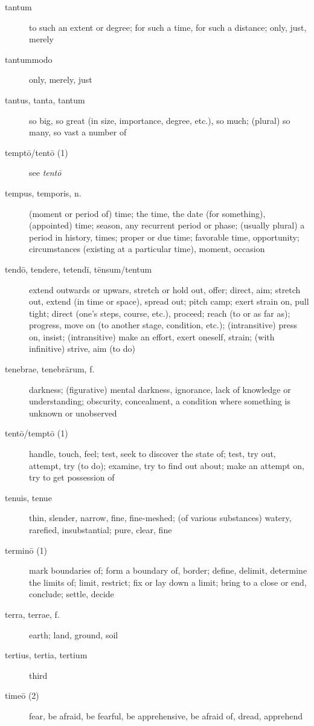 \begin{description}
    \item[tantum] \marginnote{*}to such an extent or degree; for such a time, for such a distance; only, just, merely
    \item[tantummodo] \marginnote{*}only, merely, just
    \item[tantus, tanta, tantum] \marginnote{*}so big, so great (in size, importance, degree, etc.), so much; (plural) so many, so vast a number of
    \item[temptō/tentō (1)] see \textit{tentō}
    \item[tempus, temporis, n.] \marginnote{*}(moment or period of) time; the time, the date (for something), (appointed) time; season, any recurrent period or phase; (usually plural) a period in history, times; proper or due time; favorable time, opportunity; circumstances (existing at a particular time), moment, occasion
    \item[tendō, tendere, tetendī, tēnsum/tentum] \marginnote{*}extend outwards or upwars, stretch or hold out, offer; direct, aim; stretch out, extend (in time or space), spread out; pitch camp; exert strain on, pull tight; direct (one's steps, course, etc.), proceed; reach (to or as far as); progress, move on (to another stage, condition, etc.); (intransitive) press on, insist; (intransitive) make an effort, exert oneself, strain; (with infinitive) strive, aim (to do)
    \item[tenebrae, tenebrārum, f.] \marginnote{*}darkness; (figurative) mental darkness, ignorance, lack of knowledge or understanding; obscurity, concealment, a condition where something is unknown or unobserved
    \item[tentō/temptō (1)] \marginnote{*}handle, touch, feel; test, seek to discover the state of; test, try out, attempt, try (to do); examine, try to find out about; make an attempt on, try to get possession of
    \item[tenuis, tenue] thin, slender, narrow, fine, fine-meshed; (of various substances) watery, rarefied, insubstantial; pure, clear, fine
    \item[terminō (1)] mark boundaries of; form a boundary of, border; define, delimit, determine the limits of; limit, restrict; fix or lay down a limit; bring to a close or end, conclude; settle, decide
    \item[terra, terrae, f.] \marginnote{*}earth; land, ground, soil
    \item[tertius, tertia, tertium] third
    \item[timeō (2)] \marginnote{*}fear, be afraid, be fearful, be apprehensive, be afraid of, dread, apprehend

\end{description}
